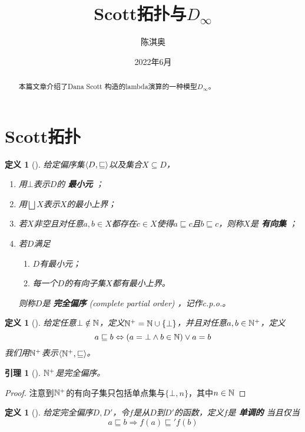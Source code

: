 \documentclass[11pt]{article}
\author{陈淇奥}
\date{2022年6月}
\title{Scott拓扑与\(D_\infty\)}
\newtheorem{lemma}[theorem]{引理}
\newtheorem{definition}[theorem]{定义}
\begin{document}
\maketitle
\begin{abstract}
本篇文章介绍了Dana Scott \cite{10.1007/BFb0073967} 构造的lambda演算的一种模型\(D_\infty\)。
\end{abstract}

\section{Scott拓扑}
\label{sec:orgc7ec157}

\begin{definition}[]
给定偏序集\(\langle D,\sqsubseteq\rangle\)以及集合\(X\subseteq D\)，
\begin{enumerate}
\item 用\(\bot\)表示\(D\)的 \textbf{最小元} ；
\item 用\(\bigsqcup X\)表示\(X\)的最小上界；
\item 若\(X\)非空且对任意\(a,b\in X\)都存在\(c\in X\)使得\(a\sqsubseteq c\)且\(b\sqsubseteq c\)，则称\(X\)是 \textbf{有向集} ；
\item 若\(D\)满足
\begin{enumerate}
\item \(D\)有最小元；
\item 每一个\(D\)的有向子集\(X\)都有最小上界。
\end{enumerate}
则称\(D\)是 \textbf{完全偏序} (complete partial order) ，记作c.p.o.。
\end{enumerate}
\end{definition}

\begin{definition}[]
给定任意\(\bot\notin\mathbb{N}\)，定义\(\mathbb{N}^+=\mathbb{N}\cup\{\bot\}\)，并且对任意\(a,b\in\mathbb{N}^+\)，定义
\begin{equation*}
a\sqsubseteq b\Leftrightarrow(a=\bot\wedge b\in\mathbb{N})\vee a=b
\end{equation*}
我们用\(\mathbb{N}^+\)表示\(\langle\mathbb{N}^+,\sqsubseteq\rangle\)。
\end{definition}

\begin{lemma}[]
\(\mathbb{N}^+\)是完全偏序。
\end{lemma}

\begin{proof}
注意到\(\mathbb{N}^+\)的有向子集只包括单点集与\(\{\bot,n\}\)，其中\(n\in\mathbb{N}\)
\end{proof}

\begin{definition}[]
给定完全偏序\(D,D'\)，令\(f\)是从\(D\)到\(D'\)的函数，定义\(f\)是 \textbf{单调的} 当且仅当
\begin{equation*}
a\sqsubseteq b\Rightarrow f(a)\sqsubseteq'f(b)
\end{equation*}
\end{definition}
\end{document}
